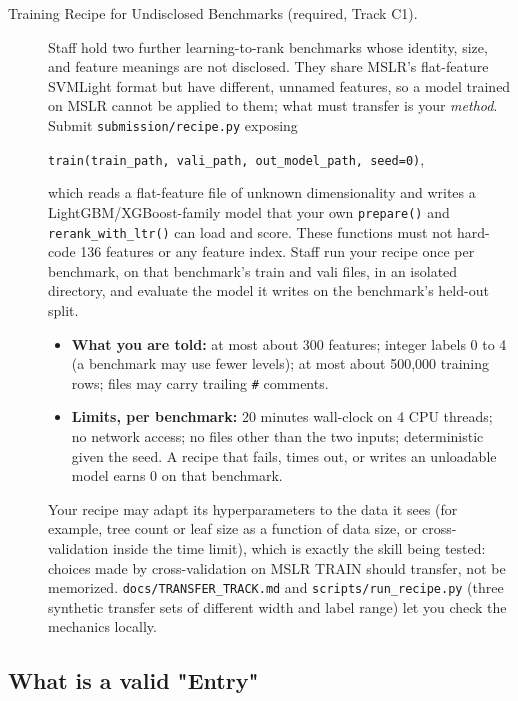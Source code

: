 \documentclass[10pt]{article}
\begin{document}
\begin{description}
  \item[Training Recipe for Undisclosed Benchmarks (required, Track C1).]
  Staff hold two further learning-to-rank benchmarks whose identity, size, and feature meanings are not disclosed. They share MSLR's flat-feature SVMLight format but have different, unnamed features, so a model trained on MSLR cannot be applied to them; what must transfer is your \emph{method}. Submit \texttt{submission/recipe.py} exposing
  \begin{center}
  \texttt{train(train\_path, vali\_path, out\_model\_path, seed=0)},
  \end{center}
  which reads a flat-feature file of unknown dimensionality and writes a LightGBM/XGBoost-family model that your own \texttt{prepare()} and \texttt{rerank\_with\_ltr()} can load and score. These functions must not hard-code 136 features or any feature index. Staff run your recipe once per benchmark, on that benchmark's train and vali files, in an isolated directory, and evaluate the model it writes on the benchmark's held-out split.
  \begin{itemize}
    \item \textbf{What you are told:} at most about 300 features; integer labels 0 to 4 (a benchmark may use fewer levels); at most about 500{,}000 training rows; files may carry trailing \texttt{\#} comments.
    \item \textbf{Limits, per benchmark:} 20 minutes wall-clock on 4 CPU threads; no network access; no files other than the two inputs; deterministic given the seed. A recipe that fails, times out, or writes an unloadable model earns 0 on that benchmark.
  \end{itemize}
  Your recipe may adapt its hyperparameters to the data it sees (for example, tree count or leaf size as a function of data size, or cross-validation inside the time limit), which is exactly the skill being tested: choices made by cross-validation on MSLR TRAIN should transfer, not be memorized. \texttt{docs/TRANSFER\_TRACK.md} and \texttt{scripts/run\_recipe.py} (three synthetic transfer sets of different width and label range) let you check the mechanics locally.
\end{description}
\subsection{What is a valid "Entry"}
\label{sec:entry}
\end{document}
